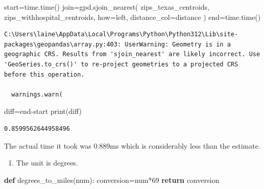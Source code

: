 \documentclass[
  letterpaper,
  DIV=11,
  numbers=noendperiod]{scrartcl}
\newenvironment{Shaded}{\begin{snugshade}}{\end{snugshade}}
\newcommand{\BuiltInTok}[1]{\textcolor[rgb]{0.00,0.23,0.31}{#1}}
\newcommand{\ControlFlowTok}[1]{\textcolor[rgb]{0.00,0.23,0.31}{\textbf{#1}}}
\newcommand{\DecValTok}[1]{\textcolor[rgb]{0.68,0.00,0.00}{#1}}
\newcommand{\KeywordTok}[1]{\textcolor[rgb]{0.00,0.23,0.31}{\textbf{#1}}}
\newcommand{\NormalTok}[1]{\textcolor[rgb]{0.00,0.23,0.31}{#1}}
\newcommand{\OperatorTok}[1]{\textcolor[rgb]{0.37,0.37,0.37}{#1}}
\newcommand{\StringTok}[1]{\textcolor[rgb]{0.13,0.47,0.30}{#1}}
\providecommand{\tightlist}{%
  \setlength{\itemsep}{0pt}\setlength{\parskip}{0pt}}\usepackage{longtable,booktabs,array}
\begin{document}
\begin{Shaded}
\begin{Highlighting}[]
\NormalTok{start}\OperatorTok{=}\NormalTok{time.time()}
\NormalTok{join}\OperatorTok{=}\NormalTok{gpd.sjoin\_nearest(}
\NormalTok{    zips\_texas\_centroids,}
\NormalTok{    zips\_withhospital\_centroids,}
\NormalTok{    how}\OperatorTok{=}\StringTok{\textquotesingle{}left\textquotesingle{}}\NormalTok{,}
\NormalTok{    distance\_col}\OperatorTok{=}\StringTok{\textquotesingle{}distance\textquotesingle{}}
\NormalTok{)}
\NormalTok{end}\OperatorTok{=}\NormalTok{time.time()}
\end{Highlighting}
\end{Shaded}

\begin{verbatim}
C:\Users\laine\AppData\Local\Programs\Python\Python312\Lib\site-packages\geopandas\array.py:403: UserWarning: Geometry is in a geographic CRS. Results from 'sjoin_nearest' are likely incorrect. Use 'GeoSeries.to_crs()' to re-project geometries to a projected CRS before this operation.

  warnings.warn(
\end{verbatim}

\begin{Shaded}
\begin{Highlighting}[]
\NormalTok{diff}\OperatorTok{=}\NormalTok{end}\OperatorTok{{-}}\NormalTok{start}
\BuiltInTok{print}\NormalTok{(diff)}
\end{Highlighting}
\end{Shaded}

\begin{verbatim}
0.8599562644958496
\end{verbatim}

The actual time it took was 0.889ms which is considerably less than the
estimate.

\begin{enumerate}
\def\labelenumi{\alph{enumi}.}
\setcounter{enumi}{2}
\tightlist
\item
  The unit is degrees.
\end{enumerate}

\begin{Shaded}
\begin{Highlighting}[]
\KeywordTok{def}\NormalTok{ degrees\_to\_miles(num):}
\NormalTok{    conversion}\OperatorTok{=}\NormalTok{num}\OperatorTok{*}\DecValTok{69}
    \ControlFlowTok{return}\NormalTok{ conversion}
\end{Highlighting}
\end{Shaded}
\end{document}
